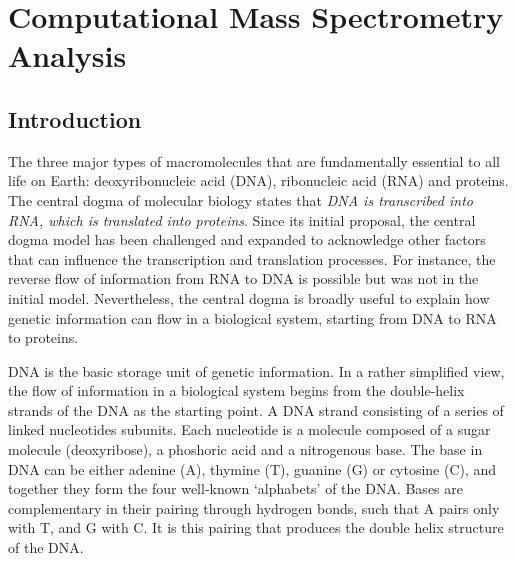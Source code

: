 \chapter{Computational Mass Spectrometry Analysis}
\label{c:background}


\section{Introduction}

The three major types of macromolecules that are fundamentally essential to all life on Earth: deoxyribonucleic acid (DNA), ribonucleic acid (RNA) and proteins. The central dogma of molecular biology states that \emph{DNA is transcribed into RNA, which is translated into proteins}. Since its initial proposal, the central dogma model has been challenged and expanded to acknowledge other factors that can influence the transcription and translation processes. For instance, the reverse flow of information from RNA to DNA is possible but was not in the initial model. Nevertheless, the central dogma is broadly useful to explain how genetic information can flow in a biological system, starting from DNA to RNA to proteins. 

DNA is the basic storage unit of genetic information. In a rather simplified view, the flow of information in a biological system begins from the double-helix strands of the DNA as the starting point. A DNA strand consisting of a series of linked nucleotides subunits. Each nucleotide is a molecule composed of a sugar molecule (deoxyribose), a phoshoric acid and a nitrogenous base. The base in DNA can be either adenine (A), thymine (T), guanine (G) or cytosine (C), and together they form the four well-known `alphabets' of the DNA. Bases are complementary in their pairing through hydrogen bonds, such that A pairs only with T, and G with C. It is this pairing that produces the double helix structure of the DNA. 

